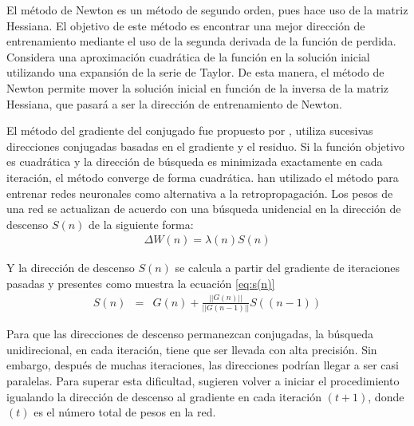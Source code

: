 El método de Newton es un método de segundo orden, pues hace uso de la matriz Hessiana. El objetivo de este método es encontrar una mejor dirección de entrenamiento mediante el uso de la segunda derivada de la función de perdida. Considera una aproximación cuadrática de la función en la solución inicial utilizando una expansión de la serie de Taylor. De esta manera, el método de Newton permite mover la solución inicial en función de la inversa de la matriz Hessiana, que pasará a ser la dirección de entrenamiento de Newton.


El método del gradiente del conjugado fue propuesto por , utiliza sucesivas direcciones conjugadas basadas en el gradiente y el residuo. Si la función objetivo es cuadrática y la dirección de búsqueda es minimizada exactamente en cada iteración, el método converge de forma cuadrática.  han utilizado el método para entrenar redes neuronales como alternativa a la retropropagación. Los pesos de una red se actualizan de acuerdo con una búsqueda unidencial en la dirección de descenso $S(n)$ de la siguiente forma:
\begin{eqnarray}
	\Delta W(n) = \lambda(n)S(n)
\end{eqnarray}

Y la dirección de descenso $S(n)$ se calcula a partir del gradiente de iteraciones pasadas y presentes como muestra la ecuación \ref{eq:s(n)}
\begin{eqnarray}
	S(n) &=& G(n) + \frac{||G(n)||}{||G(n - 1)||}S((n - 1))\label{eq:s(n)}
\end{eqnarray}

Para que las direcciones de descenso permanezcan conjugadas, la búsqueda unidirecional, en cada iteración, tiene que ser llevada con alta precisión. Sin embargo, después de muchas iteraciones, las direcciones podrían llegar a ser casi paralelas. Para superar esta dificultad,  sugieren volver a iniciar el procedimiento igualando la dirección de descenso al gradiente en cada iteración $(t + 1)$, donde $(t)$ es el número total de pesos en la red.



